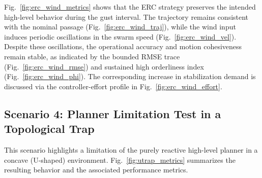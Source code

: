 \documentclass[pdflatex,sn-basic]{sn-jnl}%
\begin{document}
        Fig.~\ref{fig:erc_wind_metrics} shows that the ERC strategy preserves the intended high-level behavior during the gust interval. The trajectory remains consistent with the nominal passage (Fig.~\ref{fig:erc_wind_traj}), while the wind input induces periodic oscillations in the swarm speed (Fig.~\ref{fig:erc_wind_vel}). Despite these oscillations, the operational accuracy and motion cohesiveness remain stable, as indicated by the bounded RMSE trace (Fig.~\ref{fig:erc_wind_rmse}) and sustained high orderliness index (Fig.~\ref{fig:erc_wind_phi}). The corresponding increase in stabilization demand is discussed via the controller-effort profile in Fig.~\ref{fig:erc_wind_effort}.

    \subsection{Scenario 4: Planner Limitation Test in a Topological Trap}
        This scenario highlights a limitation of the purely reactive high-level planner in a concave (U-shaped) environment. Fig.~\ref{fig:utrap_metrics} summarizes the resulting behavior and the associated performance metrics.
\end{document}
